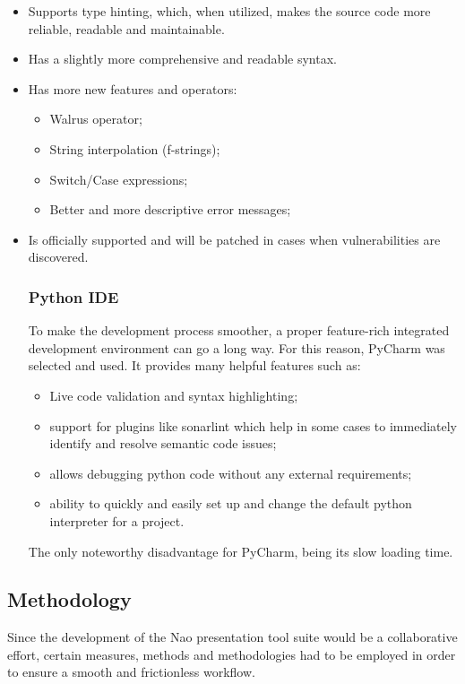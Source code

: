\documentclass[12pt, fleqn, a4paper]{article}
\begin{document}
\begin{itemize}
	\item Supports type hinting, which, when utilized, makes the source code more reliable, readable and maintainable.
	\item Has a slightly more comprehensive and readable syntax.
	\item Has more new features and operators:
		\begin{itemize}
			\item Walrus operator;
			\item String interpolation (f-strings);
			\item Switch/Case expressions;
			\item Better and more descriptive error messages;
		\end{itemize}
	\item Is officially supported and will be patched in cases when vulnerabilities are discovered.
\subsubsection{Python IDE}
To make the development process smoother, a proper feature-rich integrated development environment can go a long way. For this reason, PyCharm was selected and used. It provides many helpful features such as:
\begin{itemize}
	\item Live code validation and syntax highlighting;
	\item support for plugins like sonarlint which help in some cases to immediately identify and resolve semantic code issues;
	\item allows debugging python code without any external requirements;
	\item ability to quickly and easily set up and change the default python interpreter for a project.
\end{itemize}
The only noteworthy disadvantage for PyCharm, being its slow loading time.
\end{itemize}
\subsection{Methodology}
Since the development of the Nao presentation tool suite would be a collaborative effort, certain measures, methods and methodologies had to be employed in order to ensure a smooth and frictionless workflow.
\end{document}
